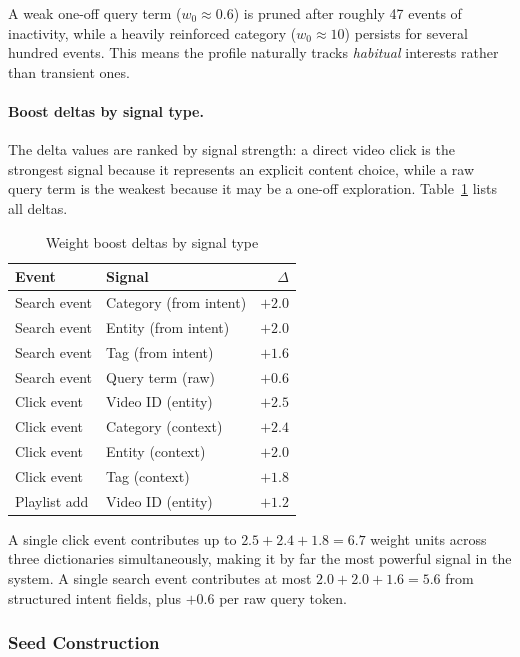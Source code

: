 A weak one-off query term ($w_0 \approx 0.6$) is pruned after roughly 47 events of inactivity,
while a heavily reinforced category ($w_0 \approx 10$) persists for several hundred events.
This means the profile naturally tracks \emph{habitual} interests rather than transient ones.

\paragraph{Boost deltas by signal type.}
The delta values are ranked by signal strength: a direct video click is the strongest signal
because it represents an explicit content choice, while a raw query term is the weakest because
it may be a one-off exploration. Table~\ref{tab:weight_boosts} lists all deltas.

\begin{table}[H]
\centering
\caption{Weight boost deltas by signal type}
\label{tab:weight_boosts}
\begin{tabular}{llr}
\toprule
\textbf{Event}  & \textbf{Signal} & \textbf{$\Delta$} \\
\midrule
Search event & Category (from intent) & $+2.0$ \\
Search event & Entity (from intent)   & $+2.0$ \\
Search event & Tag (from intent)      & $+1.6$ \\
Search event & Query term (raw)       & $+0.6$ \\
Click event  & Video ID (entity)      & $+2.5$ \\
Click event  & Category (context)     & $+2.4$ \\
Click event  & Entity (context)       & $+2.0$ \\
Click event  & Tag (context)          & $+1.8$ \\
Playlist add & Video ID (entity)      & $+1.2$ \\
\bottomrule
\end{tabular}
\end{table}

A single click event contributes up to $2.5 + 2.4 + 1.8 = 6.7$ weight units across three
dictionaries simultaneously, making it by far the most powerful signal in the system.
A single search event contributes at most $2.0 + 2.0 + 1.6 = 5.6$ from structured intent
fields, plus $+0.6$ per raw query token.

\subsubsection{Seed Construction}

